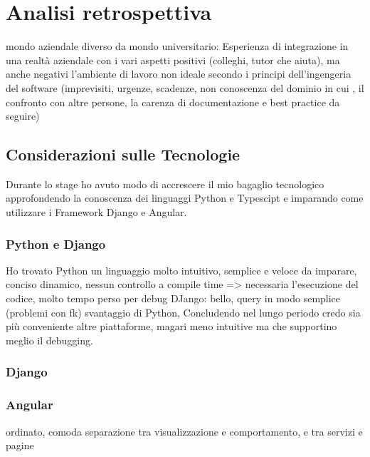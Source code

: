 
\chapter{Analisi retrospettiva} %
\label{cap:valutazione}


mondo aziendale diverso da mondo universitario:
Esperienza di integrazione in una realtà aziendale con i vari aspetti positivi (colleghi, tutor che aiuta), ma anche negativi l'ambiente di lavoro non ideale secondo i principi dell'ingengeria del software (imprevisiti, urgenze, scadenze, non conoscenza del dominio in cui , il confronto con altre persone, la carenza di documentazione e best practice da seguire)

\section{Considerazioni sulle Tecnologie}
	Durante lo stage ho avuto modo di accrescere il mio bagaglio tecnologico approfondendo la conoscenza dei linguaggi Python e Typescipt e imparando come utilizzare i Framework Django e Angular.
	
	\subsection{Python e Django}
	Ho trovato Python un linguaggio molto intuitivo, semplice e veloce da imparare, conciso 
	dinamico, nessun controllo a compile time => necessaria l'esecuzione del codice, molto tempo perso per debug
	DJango: bello, query in modo semplice (problemi con fk) svantaggio di Python, 
	Concludendo nel lungo periodo credo sia più conveniente altre piattaforme, magari meno intuitive ma che supportino meglio il debugging.
	
	\subsection{Django}
	
	\subsection{Angular}
	ordinato, comoda separazione tra visualizzazione e comportamento, e tra servizi e pagine
	

